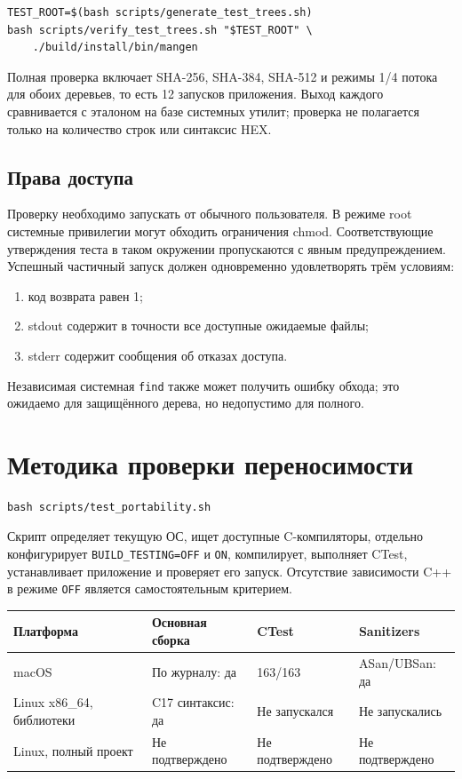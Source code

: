 \documentclass[12pt,a4paper]{article}
\begin{document}
\begin{lstlisting}
TEST_ROOT=$(bash scripts/generate_test_trees.sh)
bash scripts/verify_test_trees.sh "$TEST_ROOT" \
    ./build/install/bin/mangen
\end{lstlisting}

Полная проверка включает SHA-256, SHA-384, SHA-512 и режимы 1/4 потока
для обоих деревьев, то есть 12 запусков приложения. Выход каждого сравнивается
с эталоном на базе системных утилит; проверка не полагается только на
количество строк или синтаксис HEX.

\subsection{Права доступа}

Проверку необходимо запускать от обычного пользователя. В режиме root
системные привилегии могут обходить ограничения chmod. Соответствующие
утверждения теста в таком окружении пропускаются с явным предупреждением.
Успешный частичный запуск должен одновременно удовлетворять трём условиям:

\begin{enumerate}
\item код возврата равен 1;
\item stdout содержит в точности все доступные ожидаемые файлы;
\item stderr содержит сообщения об отказах доступа.
\end{enumerate}

Независимая системная \texttt{find} также может получить ошибку обхода;
это ожидаемо для защищённого дерева, но недопустимо для полного.

\section{Методика проверки переносимости}

\begin{lstlisting}
bash scripts/test_portability.sh
\end{lstlisting}

Скрипт определяет текущую ОС, ищет доступные C-компиляторы, отдельно
конфигурирует \texttt{BUILD\_TESTING=OFF} и \texttt{ON}, компилирует,
выполняет CTest, устанавливает приложение и проверяет его запуск.
Отсутствие зависимости C++ в режиме \texttt{OFF} является самостоятельным
критерием.

\begin{center}
\setlength{\tabcolsep}{4pt}
\begin{tabularx}{\textwidth}{P{0.32\textwidth}YYY}
\toprule
Платформа & Основная сборка & CTest & Sanitizers \\
\midrule
macOS & По журналу: да & 163/163 & ASan/UBSan: да \\
Linux x86\_64, библиотеки & C17 синтаксис: да & Не запускался & Не запускались \\
Linux, полный проект & Не подтверждено & Не подтверждено & Не подтверждено \\
\bottomrule
\end{tabularx}
\end{center}
\end{document}
